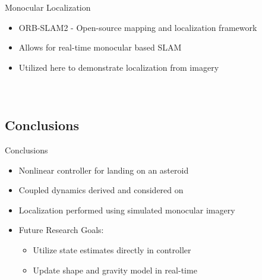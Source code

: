 \documentclass[11pt,professionalfonts]{beamer}
\begin{document}
\begin{frame}{Monocular Localization}
    \begin{itemize}
        \item ORB-SLAM2 - Open-source mapping and localization framework
        \item Allows for real-time monocular based SLAM
        \item Utilized here to demonstrate localization from imagery
    \end{itemize}
    
    \begin{center}
    ~
\end{center}
\end{frame}
\section*{}
\subsection*{Conclusions}

\begin{frame}{Conclusions}
    \begin{itemize}
        \item Nonlinear controller for landing on an asteroid
        \item Coupled dynamics derived and considered on \SE
        \item Localization performed using simulated monocular imagery
        \item Future Research Goals:
            \begin{itemize}
                \item Utilize state estimates directly in controller
                \item Update shape and gravity model in real-time
            \end{itemize}
    \end{itemize} 
\end{frame}
\end{document}
